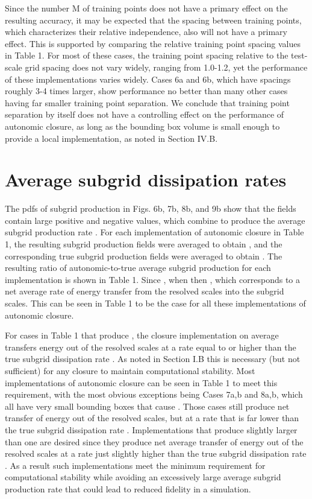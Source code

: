 Since the number M of training points does not have a primary effect on the resulting accuracy, it may be expected that the spacing between training points, which characterizes their relative independence, also will not have a primary effect. This is supported by comparing the relative training point spacing values   in Table 1. For most of these cases, the training point spacing relative to the test-scale grid spacing   does not vary widely, ranging from 1.0-1.2, yet the performance of these implementations varies widely. Cases 6a and 6b, which have spacings roughly 3-4 times larger, show performance no better than many other cases having far smaller training point separation. We conclude that training point separation by itself does not have a controlling effect on the performance of autonomic closure, as long as the bounding box volume   is small enough to provide a local implementation, as noted in Section IV.B.

\section{Average subgrid dissipation rates }

The pdfs of subgrid production in Figs. 6b, 7b, 8b, and 9b show that the   fields contain large positive and negative values, which combine to produce the average subgrid production rate  . For each implementation of autonomic closure in Table 1, the resulting   subgrid production fields   were averaged to obtain  , and the corresponding true subgrid production fields   were averaged to obtain  . The resulting ratio of autonomic-to-true average subgrid production   for each implementation is shown in Table 1. Since  , when   then  , which corresponds to a net average rate of energy transfer from the resolved scales into the subgrid scales.  This can be seen in Table 1 to be the case for all these implementations of autonomic closure. 

For cases in Table 1 that produce  , the closure implementation on average transfers energy out of the resolved scales at a rate equal to or higher than the true subgrid dissipation rate  . As noted in Section I.B this is necessary (but not sufficient) for any closure to maintain computational stability.  Most implementations of autonomic closure can be seen in Table 1 to meet this requirement, with the most obvious exceptions being Cases 7a,b and 8a,b, which all have very small bounding boxes that cause  . Those cases still produce net transfer of energy out of the resolved scales, but at a rate that is far lower than the true subgrid dissipation rate  . Implementations that produce   slightly larger than one are desired since they produce net average transfer of energy out of the resolved scales at a rate just slightly higher than the true subgrid dissipation rate  . As a result such implementations meet the minimum requirement for computational stability while avoiding an excessively large average subgrid production rate that could lead to reduced fidelity in a simulation. 


